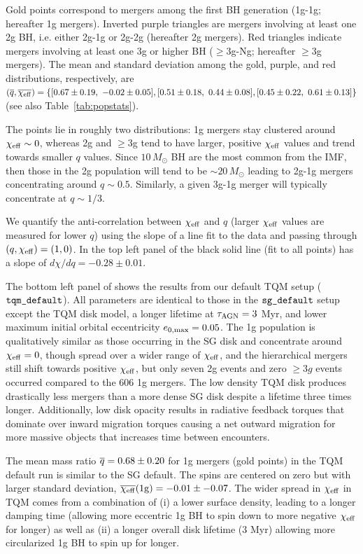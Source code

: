 Gold points correspond to mergers among the first BH generation (1g-1g; hereafter 1g mergers).
Inverted purple triangles are mergers involving at least one 2g BH, i.e. either 2g-1g or 2g-2g (hereafter 2g mergers).
Red triangles indicate mergers involving at least one 3g or higher BH ($\geq$3g-Ng; hereafter $\geq$3g mergers).
The mean and standard deviation among the gold, purple, and red distributions, respectively, are $(\overline{q},\overline{\chi_{\rm eff}})=\{[0.67\pm 0.19,\ -0.02\pm 0.05], [0.51\pm 0.18,\ 0.44\pm 0.08], [0.45\pm 0.22,\ 0.61\pm 0.13]\}$ (see also Table~\ref{tab:popstats}).

The points lie in roughly two distributions: 1g mergers stay clustered around $\chi_{\rm eff} \sim 0$, whereas 2g and $\geq$3g tend to have larger, positive $\chi_{\rm eff}$ values and trend towards smaller $q$ values.
Since $10\,M_{\odot}$ BH are the most common from the IMF, then those in the 2g population will tend to be $\sim 20\,M_{\odot}$ leading to 2g-1g mergers concentrating around $q \sim 0.5$.
Similarly, a given 3g-1g merger will typically concentrate at $q \sim 1/3$.

We quantify the anti-correlation between $\chi_{\rm eff}$ and $q$ (larger $\chi_{\rm eff}$ values are measured for lower $q$) using the slope of a line fit to the data and passing through $(q,\chi_{\rm eff})=(1,0)$.
In the top left panel of  the black solid line (fit to all points) has a slope of $d\chi/dq=-0.28\pm0.01$.

The bottom left panel of  shows the results from our default TQM setup ($\tqmdefault$).
All parameters are identical to those in the $\sgdefault$ setup except the TQM disk model, a longer lifetime at $\tau_{\rm AGN}=3$ Myr, and lower maximum initial orbital eccentricity $e_{\rm 0,max}=0.05$.
The 1g population is qualitatively similar as those occurring in the SG disk and concentrate around $\chi_{\rm eff}=0$, though spread over a wider range of $\chi_{\rm eff}$, and the hierarchical mergers still shift towards positive $\chi_{\rm eff}$, but only seven 2g events and zero $\geq3g$ events occurred compared to the 606 1g mergers.
The low density TQM disk produces drastically less mergers than a more dense SG disk despite a lifetime three times longer.
Additionally, low disk opacity results in radiative feedback torques that dominate over inward migration torques causing a net outward migration for more massive objects that increases time between encounters.

The mean mass ratio $\overline{q}=0.68\pm0.20$ for 1g mergers (gold points) in the TQM default run is similar to the SG default.
The spins are centered on zero but with larger standard deviation, $\overline{\chi_{\rm eff}}({\rm 1g})=-0.01\pm-0.07$.
The wider spread in $\chi_{\rm eff}$ in TQM comes from a combination of (i) a lower surface density, leading to a longer damping time (allowing more eccentric 1g BH to spin down to more negative $\chi_{\rm eff}$ for longer) as well as (ii) a longer overall disk lifetime (3 Myr) allowing more circularized 1g BH to spin up for longer.


